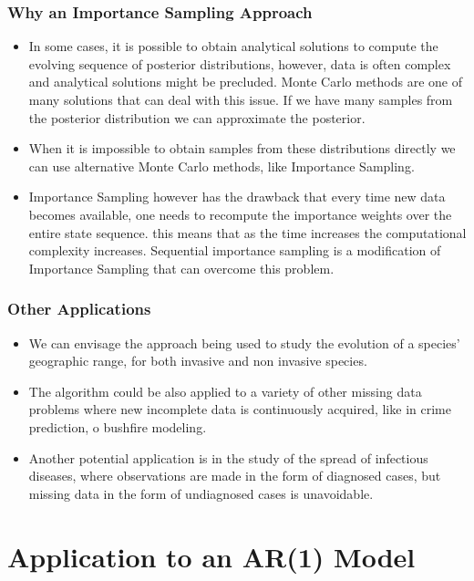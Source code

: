 \documentclass[9pt]{beamer}
\begin{document}
\begin{frame}
\frametitle{Why an Importance Sampling Approach}
\begin{itemize}
\setlength\itemsep{2em}
\item In some cases, it is possible to obtain analytical solutions to compute the evolving sequence of posterior distributions, however, data is often complex and analytical solutions might be precluded.
\itemSequential Monte Carlo methods are one of many solutions that can deal with this issue. 
If we have many samples from the posterior distribution we can approximate the posterior. 
\item When it is impossible to obtain samples from these distributions directly we can use alternative Monte Carlo methods, like Importance Sampling.
\item Importance Sampling however has the drawback that every time new data becomes available, one needs to recompute the importance weights over the entire state sequence. this means that as the time increases the computational complexity increases.
Sequential importance sampling is a modification of Importance Sampling that can overcome this problem.
\end{itemize}
\end{frame}

\begin{frame}
\frametitle{Other Applications}
\begin{itemize}
\setlength\itemsep{2em}
\item We can envisage the approach being used to study the evolution of a species’ geographic range, for both invasive and non invasive species. 
\item The algorithm could be also applied to a variety of other missing data problems where new incomplete data is continuously  acquired, like  in  crime  prediction, o  bushfire modeling. 
\item Another potential application is in the study of the spread of infectious diseases, where observations are made in the form of diagnosed cases, but  missing  data  in  the  form  of  undiagnosed  cases  is unavoidable.
\end{itemize}
\end{frame}

\section{Application to an AR(1) Model}
\end{document}
